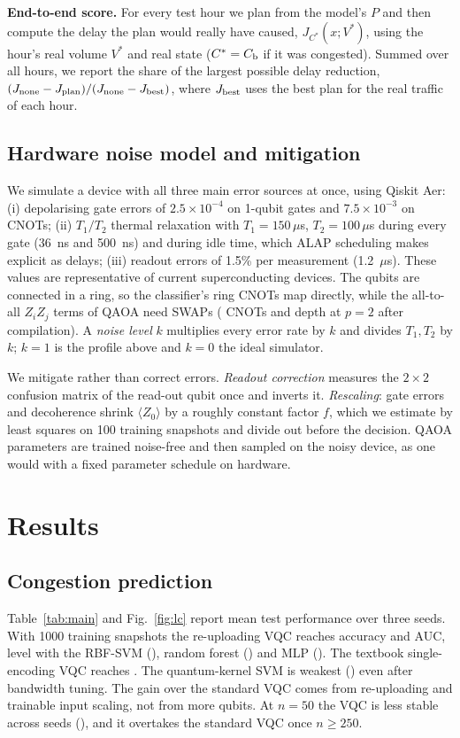 \documentclass[conference]{IEEEtran}
\begin{document}
\textbf{End-to-end score.} For every test hour we plan from the model's $P$ and then compute the delay the plan would really have caused, $J_{C^\ast}(x;V^\ast)$, using the hour's real volume $V^\ast$ and real state ($C^\ast=C_{\rm b}$ if it was congested). Summed over all hours, we report the share of the largest possible delay reduction, $(J_{\rm none}-J_{\rm plan})/(J_{\rm none}-J_{\rm best})$, where $J_{\rm best}$ uses the best plan for the real traffic of each hour.

\subsection{Hardware noise model and mitigation}
\label{sec:noise}
We simulate a device with all three main error sources at once, using Qiskit Aer: (i) depolarising gate errors of $2.5{\times}10^{-4}$ on 1-qubit gates and $7.5{\times}10^{-3}$ on CNOTs; (ii) $T_1/T_2$ thermal relaxation with $T_1{=}150\,\mu$s, $T_2{=}100\,\mu$s during every gate (36~ns and 500~ns) and during idle time, which ALAP scheduling makes explicit as delays; (iii) readout errors of 1.5\% per measurement (1.2~$\mu$s). These values are representative of current superconducting devices. The qubits are connected in a ring, so the classifier's ring CNOTs map directly, while the all-to-all $Z_iZ_j$ terms of QAOA need SWAPs (\qaoaCx{} CNOTs and depth \qaoaDepth{} at $p{=}2$ after compilation). A \emph{noise level} $k$ multiplies every error rate by $k$ and divides $T_1,T_2$ by $k$; $k{=}1$ is the profile above and $k{=}0$ the ideal simulator.

We mitigate rather than correct errors. \emph{Readout correction} measures the $2{\times}2$ confusion matrix of the read-out qubit once and inverts it. \emph{Rescaling}: gate errors and decoherence shrink $\langle Z_0\rangle$ by a roughly constant factor $f$, which we estimate by least squares on 100 training snapshots and divide out before the decision. QAOA parameters are trained noise-free and then sampled on the noisy device, as one would with a fixed parameter schedule on hardware.

\section{Results}
\subsection{Congestion prediction}
Table~\ref{tab:main} and Fig.~\ref{fig:lc} report mean test performance over three seeds. With 1000 training snapshots the re-uploading VQC reaches \accOursM{} accuracy and \aucOurs{} AUC, level with the RBF-SVM (\accSVMM{}), random forest (\accRFM{}) and MLP (\accMLPM{}). The textbook single-encoding VQC reaches \accStdM{}. The quantum-kernel SVM is weakest (\accQKM{}) even after bandwidth tuning. The gain over the standard VQC comes from re-uploading and trainable input scaling, not from more qubits. At $n{=}50$ the VQC is less stable across seeds (\accOursFifty{}), and it overtakes the standard VQC once $n\ge 250$.
\end{document}
